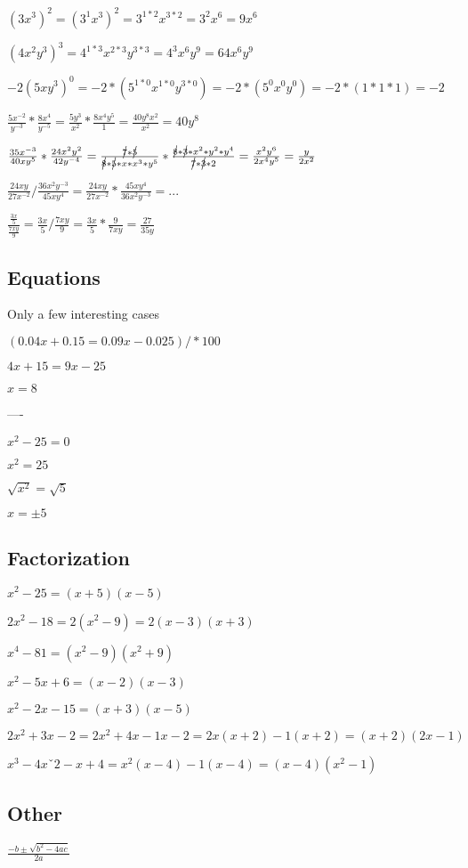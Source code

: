 \documentclass[11pt,a4paper,leqno]{article}
\begin{document}
$(3x^3)^2 = (3^1x^3)^2 = 3^{1 * 2}x^{3 * 2} = 3^2x^6 = 9x^6$

$(4x^2y^3)^3 = 4^{1 * 3}x^{2 * 3}y^{3 * 3} = 4^3x^6y^9 = 64x^6y^9$

$-2(5xy^3)^0 = -2 * (5^{1 * 0}x^{1 * 0}y^{3 * 0}) = -2 * (5^0x^0y^0) = -2 * (1 * 1 * 1) = -2$

$\frac{5x^{-2}}{y^{-3}} * \frac{8x^4}{y^{-5}} = \frac{5y^3}{x^2} * \frac{8x^4y^5}{1} = \frac{40y^8x^2}{x^2} = 40y^8$

$\frac{35x^{-3}}{40xy^5} * \frac{24x^2y^2}{42y^{-4}} = \frac{\cancel{7} * \cancel{5}}{\cancel{8} * \cancel{5} * x * x^3 * y^5} * \frac{\cancel{8} * \cancel{3} * x^2 * y^2 * y^4}{\cancel{7} * \cancel{3} * 2} = \frac{x^2y^6}{2x^4y^5} = \frac{y}{2x^2}$

$\frac{24xy}{27x^{-2}} / \frac{36x^2y^{-3}}{45xy^4} = \frac{24xy}{27x^{-2}} * \frac{45xy^4}{36x^2y^{-3}} = ...$


$\frac{\frac{3x}{5}}{\frac{7xy}{9}} = \frac{3x}{5} / \frac{7xy}{9} = \frac{3x}{5} * \frac{9}{7xy} = \frac{27}{35y}$

\subsection{Equations}

Only a few interesting cases

$(0.04x + 0.15 = 0.09x - 0.025) / * 100 $

$4x + 15 = 9x - 25$

$x = 8$

----

$x^2 - 25 = 0$

$x^2 = 25$

$\sqrt{x^2} = \sqrt{5}$

$x = \pm 5$


\subsection{Factorization}


$x^2 - 25 = (x + 5)(x - 5)$

$2x^2 - 18 = 2(x^2 - 9) = 2(x - 3)(x + 3)$

$x^4 - 81 = (x^2 - 9)(x^2 + 9)$

$x^2 - 5x + 6 = (x - 2)(x - 3)$

$x^2 - 2x - 15 = (x + 3)(x - 5)$

$2x^2 + 3x - 2 = 2x^2 + 4x - 1x - 2 = 2x(x + 2) - 1(x + 2) = (x + 2)(2x - 1)$


$x^3 - 4xˇ2 - x + 4 = x^2(x - 4) -1(x - 4) = (x - 4)(x^2 - 1)$

\subsection{Other}

$\frac{-b \pm \sqrt{b^2 - 4ac}}{2a}$
\end{document}
